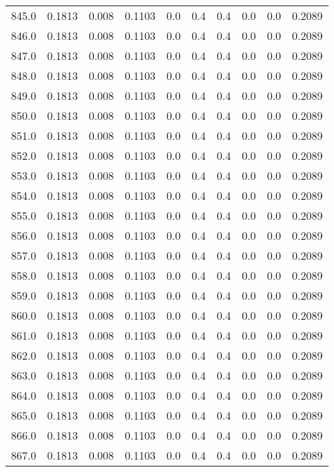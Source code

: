 \begin{longtable}{lrrrrrrrrr}
845.0 & 0.1813 & 0.008 & 0.1103 & 0.0 & 0.4 & 0.4 & 0.0 & 0.0 & 0.2089 \\
846.0 & 0.1813 & 0.008 & 0.1103 & 0.0 & 0.4 & 0.4 & 0.0 & 0.0 & 0.2089 \\
847.0 & 0.1813 & 0.008 & 0.1103 & 0.0 & 0.4 & 0.4 & 0.0 & 0.0 & 0.2089 \\
848.0 & 0.1813 & 0.008 & 0.1103 & 0.0 & 0.4 & 0.4 & 0.0 & 0.0 & 0.2089 \\
849.0 & 0.1813 & 0.008 & 0.1103 & 0.0 & 0.4 & 0.4 & 0.0 & 0.0 & 0.2089 \\
850.0 & 0.1813 & 0.008 & 0.1103 & 0.0 & 0.4 & 0.4 & 0.0 & 0.0 & 0.2089 \\
851.0 & 0.1813 & 0.008 & 0.1103 & 0.0 & 0.4 & 0.4 & 0.0 & 0.0 & 0.2089 \\
852.0 & 0.1813 & 0.008 & 0.1103 & 0.0 & 0.4 & 0.4 & 0.0 & 0.0 & 0.2089 \\
853.0 & 0.1813 & 0.008 & 0.1103 & 0.0 & 0.4 & 0.4 & 0.0 & 0.0 & 0.2089 \\
854.0 & 0.1813 & 0.008 & 0.1103 & 0.0 & 0.4 & 0.4 & 0.0 & 0.0 & 0.2089 \\
855.0 & 0.1813 & 0.008 & 0.1103 & 0.0 & 0.4 & 0.4 & 0.0 & 0.0 & 0.2089 \\
856.0 & 0.1813 & 0.008 & 0.1103 & 0.0 & 0.4 & 0.4 & 0.0 & 0.0 & 0.2089 \\
857.0 & 0.1813 & 0.008 & 0.1103 & 0.0 & 0.4 & 0.4 & 0.0 & 0.0 & 0.2089 \\
858.0 & 0.1813 & 0.008 & 0.1103 & 0.0 & 0.4 & 0.4 & 0.0 & 0.0 & 0.2089 \\
859.0 & 0.1813 & 0.008 & 0.1103 & 0.0 & 0.4 & 0.4 & 0.0 & 0.0 & 0.2089 \\
860.0 & 0.1813 & 0.008 & 0.1103 & 0.0 & 0.4 & 0.4 & 0.0 & 0.0 & 0.2089 \\
861.0 & 0.1813 & 0.008 & 0.1103 & 0.0 & 0.4 & 0.4 & 0.0 & 0.0 & 0.2089 \\
862.0 & 0.1813 & 0.008 & 0.1103 & 0.0 & 0.4 & 0.4 & 0.0 & 0.0 & 0.2089 \\
863.0 & 0.1813 & 0.008 & 0.1103 & 0.0 & 0.4 & 0.4 & 0.0 & 0.0 & 0.2089 \\
864.0 & 0.1813 & 0.008 & 0.1103 & 0.0 & 0.4 & 0.4 & 0.0 & 0.0 & 0.2089 \\
865.0 & 0.1813 & 0.008 & 0.1103 & 0.0 & 0.4 & 0.4 & 0.0 & 0.0 & 0.2089 \\
866.0 & 0.1813 & 0.008 & 0.1103 & 0.0 & 0.4 & 0.4 & 0.0 & 0.0 & 0.2089 \\
867.0 & 0.1813 & 0.008 & 0.1103 & 0.0 & 0.4 & 0.4 & 0.0 & 0.0 & 0.2089 \\

\end{longtable}
